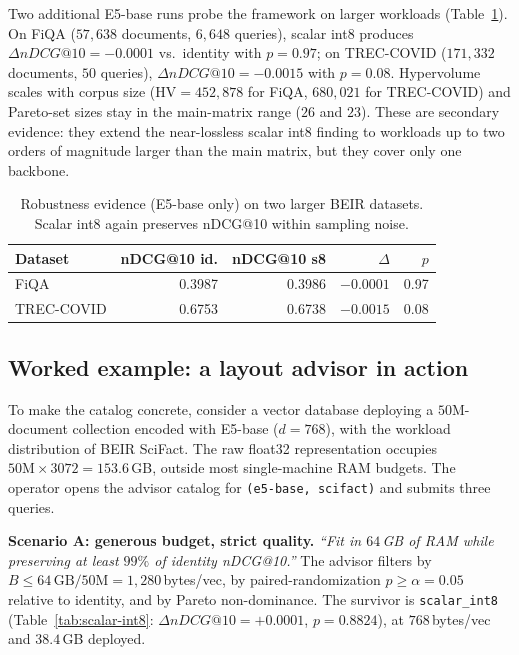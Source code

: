 \documentclass[sigconf]{acmart}
\makeatletter
\newcommand{\ndcg}{nDCG@10}
\newcommand{\HV}{\mathrm{HV}}
\makeatother
\begin{document}
Two additional E5-base runs probe the framework on larger workloads (Table~\ref{tab:robustness}). On FiQA ($57{,}638$ documents, $6{,}648$ queries), scalar int8 produces $\Delta\ndcg = -0.0001$ vs.\ identity with $p = 0.97$; on TREC-COVID ($171{,}332$ documents, $50$ queries), $\Delta\ndcg = -0.0015$ with $p = 0.08$. Hypervolume scales with corpus size ($\HV = 452{,}878$ for FiQA, $680{,}021$ for TREC-COVID) and Pareto-set sizes stay in the main-matrix range ($26$ and $23$). These are secondary evidence: they extend the near-lossless scalar int8 finding to workloads up to two orders of magnitude larger than the main matrix, but they cover only one backbone.

\begin{table}[t]
\centering
\small
\caption{Robustness evidence (E5-base only) on two larger BEIR datasets. Scalar int8 again preserves \ndcg{} within sampling noise.}
\label{tab:robustness}
\begin{tabular}{lrrrr}
\toprule
Dataset & \ndcg{} id. & \ndcg{} s8 & $\Delta$ & $p$ \\
\midrule
FiQA       & 0.3987 & 0.3986 & $-0.0001$ & 0.97 \\
TREC-COVID & 0.6753 & 0.6738 & $-0.0015$ & 0.08 \\
\bottomrule
\end{tabular}
\end{table}

\subsection{Worked example: a layout advisor in action}
\label{sec:advisor-example}

To make the catalog concrete, consider a vector database deploying a $50$M-document collection encoded with E5-base ($d{=}768$), with the workload distribution of BEIR SciFact. The raw float32 representation occupies $50\text{M} \times 3072 = 153.6$\,GB, outside most single-machine RAM budgets. The operator opens the advisor catalog for \texttt{(e5-base, scifact)} and submits three queries.

\textbf{Scenario A: generous budget, strict quality.}
\emph{``Fit in $64$\,GB of RAM while preserving at least $99\%$ of identity \ndcg{}.''}
The advisor filters by $B \le 64\,\mathrm{GB} / 50\text{M} = 1{,}280$\,bytes/vec, by paired-randomization $p \ge \alpha{=}0.05$ relative to identity, and by Pareto non-dominance. The survivor is \texttt{scalar\_int8} (Table~\ref{tab:scalar-int8}: $\Delta\ndcg{} = +0.0001$, $p = 0.8824$), at $768$\,bytes/vec and $38.4$\,GB deployed.
\end{document}
